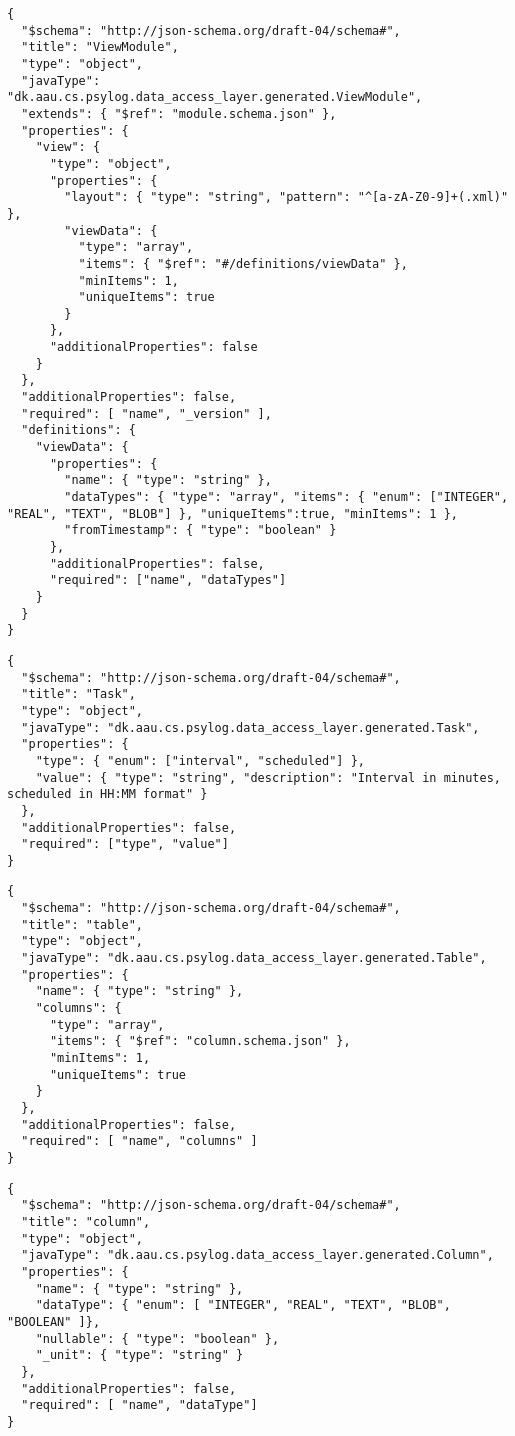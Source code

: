 \begin{lstlisting}[caption=ViewModule]
{
  "$schema": "http://json-schema.org/draft-04/schema#",
  "title": "ViewModule",
  "type": "object",
  "javaType": "dk.aau.cs.psylog.data_access_layer.generated.ViewModule",
  "extends": { "$ref": "module.schema.json" },
  "properties": {
    "view": {
      "type": "object",
      "properties": {
        "layout": { "type": "string", "pattern": "^[a-zA-Z0-9]+(.xml)" },
        "viewData": {
          "type": "array",
          "items": { "$ref": "#/definitions/viewData" },
          "minItems": 1,
          "uniqueItems": true
        }
      },
      "additionalProperties": false
    }
  },
  "additionalProperties": false,
  "required": [ "name", "_version" ],
  "definitions": {
    "viewData": {
      "properties": {
        "name": { "type": "string" },
        "dataTypes": { "type": "array", "items": { "enum": ["INTEGER", "REAL", "TEXT", "BLOB"] }, "uniqueItems":true, "minItems": 1 },
        "fromTimestamp": { "type": "boolean" }
      },
      "additionalProperties": false,
      "required": ["name", "dataTypes"]
    }
  }
}
\end{lstlisting}

\begin{lstlisting}[caption=Task]
{
  "$schema": "http://json-schema.org/draft-04/schema#",
  "title": "Task",
  "type": "object",
  "javaType": "dk.aau.cs.psylog.data_access_layer.generated.Task",
  "properties": {
    "type": { "enum": ["interval", "scheduled"] },
    "value": { "type": "string", "description": "Interval in minutes, scheduled in HH:MM format" }
  },
  "additionalProperties": false,
  "required": ["type", "value"]
}
\end{lstlisting}

\begin{lstlisting}[caption=Table]
{
  "$schema": "http://json-schema.org/draft-04/schema#",
  "title": "table",
  "type": "object",
  "javaType": "dk.aau.cs.psylog.data_access_layer.generated.Table",
  "properties": {
    "name": { "type": "string" },
    "columns": {
      "type": "array",
      "items": { "$ref": "column.schema.json" },
      "minItems": 1,
      "uniqueItems": true
    }
  },
  "additionalProperties": false,
  "required": [ "name", "columns" ]
}
\end{lstlisting}

\begin{lstlisting}[caption=Column]
{
  "$schema": "http://json-schema.org/draft-04/schema#",
  "title": "column",
  "type": "object",
  "javaType": "dk.aau.cs.psylog.data_access_layer.generated.Column",
  "properties": {
    "name": { "type": "string" },
    "dataType": { "enum": [ "INTEGER", "REAL", "TEXT", "BLOB", "BOOLEAN" ]},
    "nullable": { "type": "boolean" },
    "_unit": { "type": "string" }
  },
  "additionalProperties": false,
  "required": [ "name", "dataType"]
}
\end{lstlisting}
